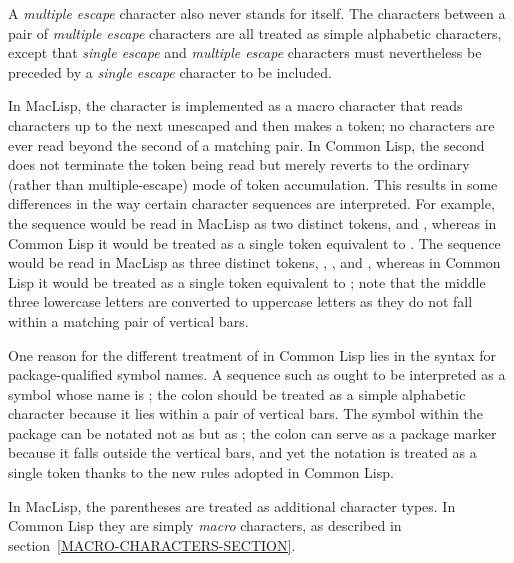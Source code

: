 A \emph{multiple escape} character also never stands for itself.  The characters
between a pair of \emph{multiple escape} characters are all treated as
simple alphabetic characters, except that \emph{single escape} and
\emph{multiple escape} characters must nevertheless be preceded by
a \emph{single escape} character to be included.

\beforenoterule
\begin{incompatibility}
In MacLisp, the \cd{|} character is implemented
as a macro character that reads characters up to the next unescaped
\cd{|} and then makes a token; no characters are ever read beyond
the second \cd{|} of a matching pair.
In Common Lisp, the second \cd{|} does not terminate the token being read
but merely reverts to the ordinary (rather than multiple-escape) mode
of token accumulation.  This results in some differences in the way
certain character sequences are interpreted.  For example,
the sequence  would be read in MacLisp
as two distinct tokens,  and , whereas in Common Lisp
it would be treated as a single token equivalent to .
The sequence  would be read in MacLisp
as three distinct tokens, , , and , whereas in Common Lisp
it would be treated as a single token equivalent to ;
note that the middle three lowercase letters are converted to
uppercase letters as they
do not fall within a matching pair of vertical bars.

One reason for the different treatment of \cd{|} in Common Lisp lies
in the syntax for package-qualified symbol names.  A sequence such as
 ought to be interpreted as a symbol whose name is
; the colon should be treated as a simple alphabetic
character because it lies within a pair of vertical bars.  The symbol
 within the package  can be notated not as 
but as ; the colon can serve as a package marker because
it falls outside the vertical bars, and yet the notation is treated as a single
token thanks to the new rules adopted in Common Lisp.

\goodbreak

In MacLisp, the parentheses are treated as
additional character types.  In Common Lisp they are simply \emph{macro} characters,
as described in section~\ref{MACRO-CHARACTERS-SECTION}.


\end{incompatibility}
